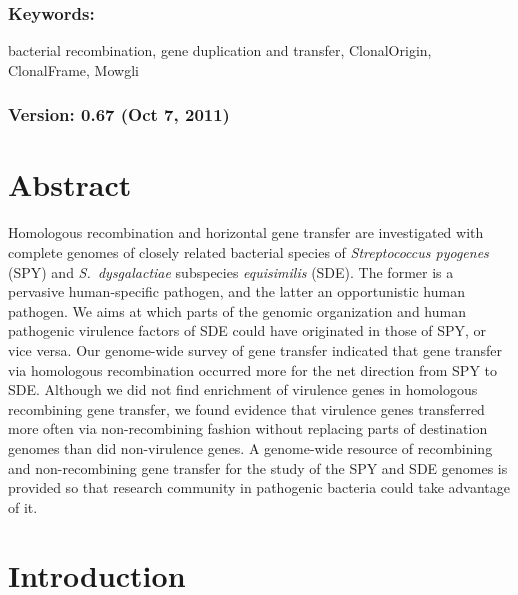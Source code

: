 \documentclass[english]{article}
\begin{document}
\subsubsection*{Keywords:}

bacterial recombination, gene duplication and transfer, ClonalOrigin,
ClonalFrame, Mowgli


\subsubsection*{Version: 0.67 (Oct 7, 2011) \clearpage{}}


\section*{Abstract}
Homologous recombination and horizontal gene transfer are investigated with
complete genomes of closely related bacterial species of \textit{Streptococcus
pyogenes} (SPY) and \textit{S.\ dysgalactiae} subspecies \textit{equisimilis}
(SDE).  The former is a pervasive human-specific pathogen, and the latter an
opportunistic human pathogen.  We aims at which parts of the genomic
organization and human pathogenic virulence factors of SDE could have originated
in those of SPY, or vice versa.  Our genome-wide survey of gene transfer
indicated that gene transfer via homologous recombination occurred more for the
net direction from SPY to SDE.  Although we did not find enrichment of virulence
genes in homologous recombining gene transfer, we found evidence that
virulence genes transferred more often via non-recombining fashion without
replacing parts of destination genomes than did non-virulence genes.  A
genome-wide resource of recombining and non-recombining gene transfer for the
study of the SPY and SDE genomes is provided so that research community in
pathogenic bacteria could take advantage of it.

\clearpage{}

\section{Introduction}
\end{document}
